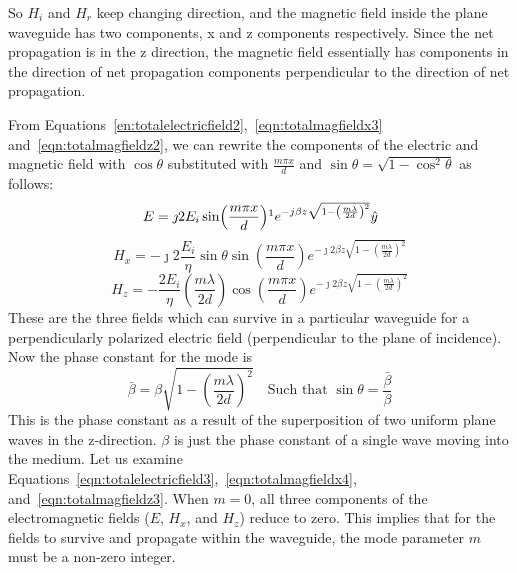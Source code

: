 So $H_i$ and $H_r$ keep changing direction, and the magnetic field inside the plane waveguide has two components, x and z components respectively. Since the net propagation is in the z direction, the magnetic field essentially has components in the direction of net propagation components perpendicular to the direction of net propagation.

From Equations~\eqref{en:totalelectricfield2},~\eqref{eqn:totalmagfieldx3} and~\eqref{eqn:totalmagfieldz2}, we can rewrite the components of the electric and magnetic field with $\cos\theta$ substituted with $\frac{m\pi x}{d}$ and $\sin\theta = \sqrt{1 - \cos^2\theta}$ as follows:
\begin{dmath}
E=\jmath 2 E_i \sin(\frac{m\pi x}{d})\footnotemark e^{-j\beta z\sqrt{1 - \left(\frac{m\lambda}{2d}\right)^2}} \hat{y}
\label{eqn:totalelectricfield3}
\end{dmath}
\begin{dmath}
H_x = -\jmath 2\frac{E_i}{\eta}\sin\theta\sin(\frac{m\pi x}{d}) e^{-\jmath 2\beta z\sqrt{1 - \left(\frac{m\lambda}{2d}\right)^2}}
\label{eqn:totalmagfieldx4}
\end{dmath}
\begin{dmath}
H_z = -\frac{2E_i}{\eta}\left(\frac{m\lambda}{2d}\right)\cos(\frac{m\pi x}{d})e^{-\jmath 2\beta z\sqrt{1 - \left(\frac{m\lambda}{2d}\right)^2}}
\label{eqn:totalmagfieldz3}
\end{dmath}
These are the three fields which can survive in a particular waveguide for a perpendicularly polarized electric field (perpendicular to the plane of incidence). Now the phase constant for the mode is
\begin{dmath}
\bar{\beta} = \beta\sqrt{1 - \left(\frac{m\lambda}{2d}\right)^2}\quad\text{Such that $\sin\theta
=\frac{\bar{\beta}}{\beta}$}
\label{eqn:phaseconst}
\end{dmath}
This is the phase constant as a result of the superposition of two uniform plane waves in the z-direction. $\beta$ is just the phase constant of a single wave moving into the medium. Let us examine Equations~\eqref{eqn:totalelectricfield3},~\eqref{eqn:totalmagfieldx4}, and~\eqref{eqn:totalmagfieldz3}. When $m=0$, all three components of the electromagnetic fields ($E$, $H_x$, and $H_z$) reduce to zero. This implies that for the fields to survive and propagate within the waveguide, the mode parameter $m$ must be a non-zero integer.

